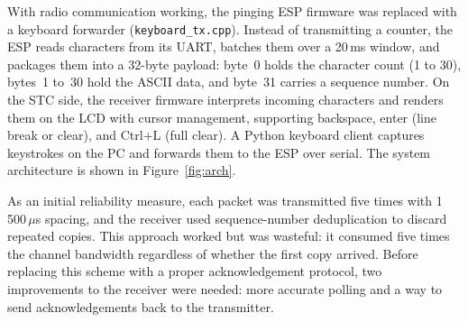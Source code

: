 \documentclass[12pt, a4paper]{article}
\begin{document}
\begin{listing}[ht]
\inputminted[firstline=188, lastline=206, fontsize=\footnotesize, frame=single, linenos]{c}{../STC89C52/nrf24l01.h}
\caption{NRF initialization with SPI timing workarounds (\texttt{nrf24l01.h}).}
\label{lst:nrf-config}
\end{listing}

With radio communication working, the pinging ESP firmware was replaced with a keyboard forwarder (\texttt{keyboard\_tx.cpp}). Instead of transmitting a counter, the ESP reads characters from its UART, batches them over a 20\,ms window, and packages them into a 32-byte payload: byte~0 holds the character count (1 to 30), bytes~1 to~30 hold the ASCII data, and byte~31 carries a sequence number. On the STC side, the receiver firmware interprets incoming characters and renders them on the LCD with cursor management, supporting backspace, enter (line break or clear), and Ctrl+L (full clear). A Python keyboard client captures keystrokes on the PC and forwards them to the ESP over serial. The system architecture is shown in Figure~\ref{fig:arch}.

As an initial reliability measure, each packet was transmitted five times with 1\,500\,$\mu$s spacing, and the receiver used sequence-number deduplication to discard repeated copies. This approach worked but was wasteful: it consumed five times the channel bandwidth regardless of whether the first copy arrived. Before replacing this scheme with a proper acknowledgement protocol, two improvements to the receiver were needed: more accurate polling and a way to send acknowledgements back to the transmitter.
\end{document}
